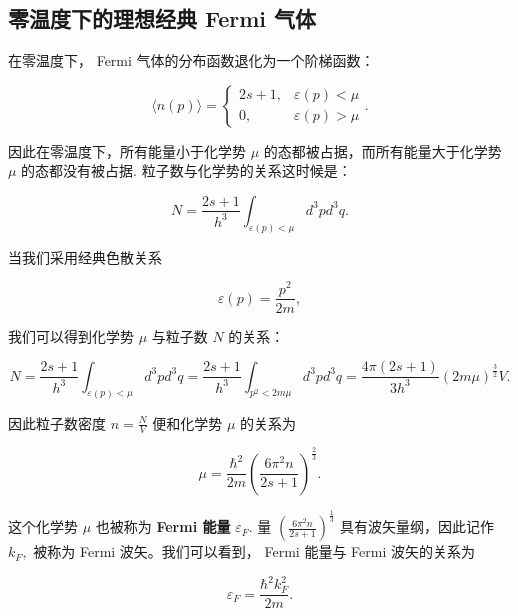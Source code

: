 \subsection{零温度下的理想经典 Fermi 气体}
在零温度下， Fermi 气体的分布函数退化为一个阶梯函数：
\begin{linenomath}\begin{equation}
    \langle n(p) \rangle = \begin{cases}
        2s+1, & \varepsilon(p) < \mu\\
        0, & \varepsilon(p) > \mu
    \end{cases}.
\end{equation}\end{linenomath}
因此在零温度下，所有能量小于化学势 $\mu$ 的态都被占据，而所有能量大于化学势 $\mu$ 的态都没有被占据.
粒子数与化学势的关系这时候是：
\begin{linenomath}\begin{equation}
    N = \frac{2s+1}{h^3}\int_{\varepsilon(p) < \mu} d^3p d^3 q.
\end{equation}\end{linenomath}
当我们采用经典色散关系
\begin{linenomath}\begin{equation}
    \varepsilon(p) = \frac{p^2}{2m},
\end{equation}\end{linenomath}
我们可以得到化学势 $\mu$ 与粒子数 $N$ 的关系：
\begin{linenomath}\begin{equation}
    N = \frac{2s+1}{h^3}\int_{\varepsilon(p) < \mu} d^3p d^3 q = \frac{2s+1}{h^3}\int_{p^2 < 2m\mu} d^3p d^3 q = \frac{4\pi(2s+1)}{3h^3} (2m\mu)^{\frac{3}{2}}V.
\end{equation}\end{linenomath}
因此粒子数密度 $n=\frac{N}{V}$ 便和化学势 $\mu$ 的关系为
\begin{linenomath}\begin{equation}
    \mu = \frac{\hbar^2}{2m}\left( \frac{6\pi^2 n}{2s+1} \right)^{\frac{2}{3}}.
\end{equation}\end{linenomath}
这个化学势 $\mu$ 也被称为 \textbf{Fermi 能量} $\varepsilon_F.$ 量 $(\frac{6\pi^2 n}{2s+1})^{\frac13}$ 具有波矢量纲，因此记作 $k_F,$ 被称为 Fermi 波矢。我们可以看到， Fermi 能量与 Fermi 波矢的关系为
\begin{linenomath}\begin{equation}
    \varepsilon_F = \frac{\hbar^2k_F^2}{2m}.
\end{equation}\end{linenomath}
